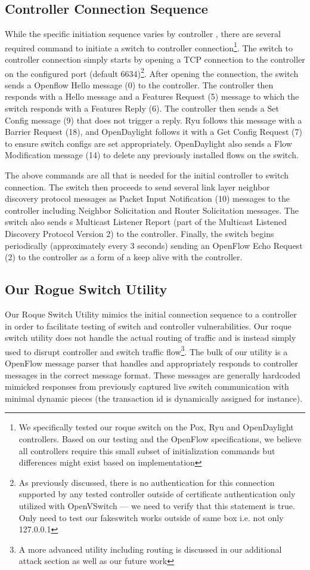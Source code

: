 \subsection {Controller Connection Sequence}
While the specific initiation sequence varies by controller , there are several required command to initiate a switch to controller connection\footnote{We specifically tested our roque switch on the Pox, Ryu and OpenDaylight controllers. Based on our testing and the OpenFlow specifications, we believe all controllers require this small subset of initialization commands but differences might exist based on implementation}. The switch to controller connection simply starts by opening a TCP connection to the controller on the configured port (default 6634)\footnote{As previously discussed, there is no authentication for this connection supported by any tested controller outside of certificate authentication only utilized with OpenVSwitch --- we need to verify that this statement is true. Only need to test our fakeswitch works outside of same box i.e. not only 127.0.0.1}.  After opening the connection, the switch sends a Openflow Hello message (0) to the controller. The controller then responds with a Hello message and a Features Request (5) message to which the switch responds with a  Features Reply (6). The controller then sends a Set Config message (9) that does not trigger a reply. Ryu follows this message with a Barrier Request (18), and OpenDaylight follows it with a  Get Config Request (7) to ensure switch configs are set appropriately. OpenDaylight also sends a Flow Modification message (14) to delete any previously installed flows on the switch.

The above commands are all that is needed for the initial controller to switch connection. The switch then proceeds to send several link layer neighbor discovery protocol messages as Packet Input Notification (10) messages to the controller including  Neighbor Solicitation and Router Solicitation messages. The switch also sends s Multicast Listener Report (part of the Multicast Listened Discovery Protocol Version 2) to the controller. Finally, the switch begins periodically (approximately every 3 seconds) sending an OpenFlow Echo Request (2) to the controller as a form of a keep alive with the controller.

\subsection{Our Rogue Switch Utility}
Our Roque Switch Utility mimics the initial connection sequence to a controller in order to facilitate testing of switch and controller vulnerabilities. Our roque switch utility does not handle the actual routing of traffic and is instead simply used to disrupt controller and switch traffic flow\footnote{A more advanced utility including routing is discussed in our additional attack section as well as our future work}. The bulk of our utility is a OpenFlow message parser that handles and appropriately responds to controller messages in the correct message format. These messages are generally hardcoded mimicked responses from previously captured live switch communication with minimal dynamic pieces (the transaction id is dynamically assigned for instance). 
